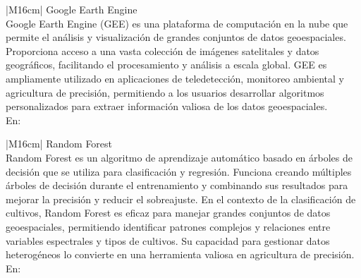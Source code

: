 \begin{table}[h!]
  \centering
  \renewcommand{\arraystretch}{2} %
  \begin{tabular}{|M{16cm}|}
    \hline
    Google Earth Engine \\
    \hline
    Google Earth Engine (GEE) es una plataforma de computación en la nube que permite el análisis y visualización de grandes conjuntos de datos geoespaciales. Proporciona acceso a una vasta colección de imágenes satelitales y datos geográficos, facilitando el procesamiento y análisis a escala global. GEE es ampliamente utilizado en aplicaciones de teledetección, monitoreo ambiental y agricultura de precisión, permitiendo a los usuarios desarrollar algoritmos personalizados para extraer información valiosa de los datos geoespaciales.
    \\
    \hline
    En: \cite{Gorelick2017} \\
    \hline
  \end{tabular}
  \label{tab:argumento4b}
\end{table}

\begin{table}[h!]
  \centering
  \renewcommand{\arraystretch}{2} %
  \begin{tabular}{|M{16cm}|}
    \hline
    Random Forest \\
    \hline
    Random Forest es un algoritmo de aprendizaje automático basado en árboles de decisión que se utiliza para clasificación y regresión. Funciona creando múltiples árboles de decisión durante el entrenamiento y combinando sus resultados para mejorar la precisión y reducir el sobreajuste. En el contexto de la clasificación de cultivos, Random Forest es eficaz para manejar grandes conjuntos de datos geoespaciales, permitiendo identificar patrones complejos y relaciones entre variables espectrales y tipos de cultivos. Su capacidad para gestionar datos heterogéneos lo convierte en una herramienta valiosa en agricultura de precisión.
    \\
    \hline
    En: \cite{Breiman2001} \\
    \hline
  \end{tabular}
  \label{tab:argumento4c}
\end{table}